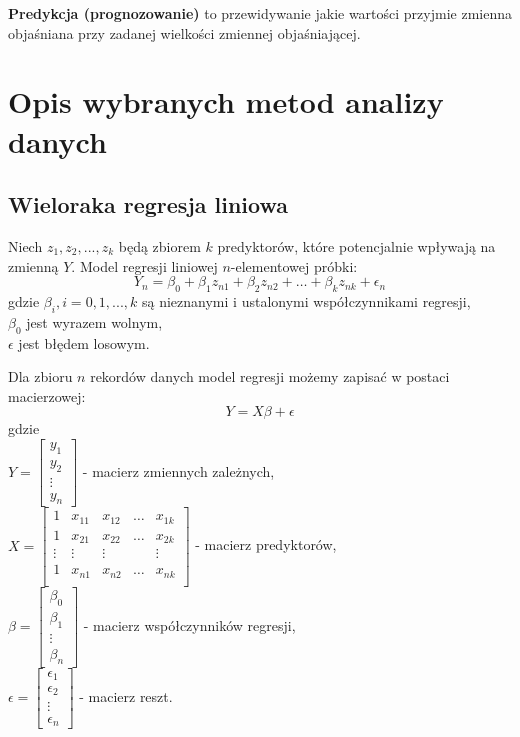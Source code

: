 \textbf{Predykcja (prognozowanie)} to przewidywanie jakie wartości przyjmie zmienna objaśniana przy zadanej wielkości zmiennej objaśniającej.\cite{bptstatystyka}
\section{Opis wybranych metod analizy danych}\label{metody_analizy_danych}
\subsection{Wieloraka regresja liniowa} \label{regresja}
Niech \(z_1, z_2, ..., z_k\) będą zbiorem \(k\) predyktorów, które potencjalnie wpływają na zmienną \(Y\). Model regresji liniowej \(n\)-elementowej próbki:
\[Y_n = \beta_0 + \beta_1z_{n1} + \beta_2z_{n2} + \dots + \beta_kz_{nk} + \epsilon_n\]
gdzie \(\beta_i, i = 0, 1, ..., k\) są nieznanymi i ustalonymi współczynnikami regresji,\\
\(\beta_0\) jest wyrazem wolnym,\\
\(\epsilon\) jest błędem losowym.\cite{wielowymiarowymodelregresjiliniowej2014}

Dla zbioru \(n\) rekordów danych model regresji możemy zapisać w postaci macierzowej: \[Y = X\beta + \epsilon\]
gdzie\\
\(Y = \begin{bmatrix}
y_1 \\
y_2 \\
\vdots \\
y_n
\end{bmatrix}\) - macierz zmiennych zależnych,\\[5pt]
\(X = \begin{bmatrix}
1 & x_{11} & x_{12} & \dots & x_{1k} \\
1 & x_{21} & x_{22} & \dots & x_{2k} \\
\vdots & \vdots & \vdots & & \vdots \\
1 & x_{n1} & x_{n2} & \dots & x_{nk} \\
\end{bmatrix}\) - macierz predyktorów,\\[5pt]
\(\beta = \begin{bmatrix}
\beta_0 \\
\beta_1 \\
\vdots \\
\beta_n
\end{bmatrix}\) - macierz współczynników regresji,\\[5pt]
\(\epsilon = \begin{bmatrix}
\epsilon_1 \\
\epsilon_2 \\
\vdots \\
\epsilon_n
\end{bmatrix} \) - macierz reszt.\cite{martinabremer2012}\\[10pt]

